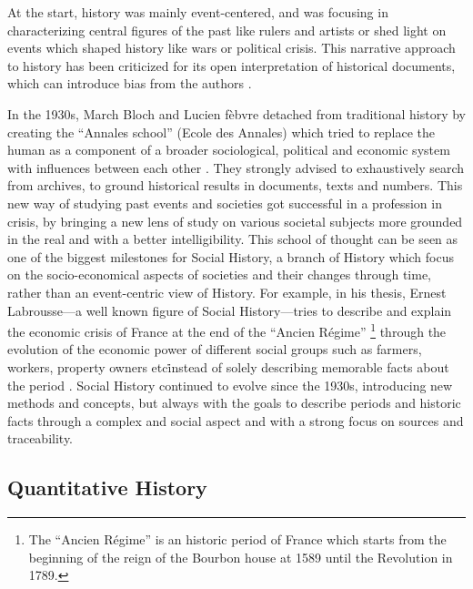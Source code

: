 At the start, history was mainly event-centered, and was focusing in characterizing central figures of the past like rulers and artists or shed light on events which shaped history like wars or political crisis.
This narrative approach to history has been criticized for its open interpretation of historical documents, which can introduce bias from the authors \cite{bourdieuRapportsEntreSociologie1995}.

In the 1930s, March Bloch and Lucien fèbvre detached from traditional history by creating the ``Annales school'' (Ecole des Annales) which tried to replace the human as a component of a broader sociological, political and economic system with influences between each other \cite{burkeHistorySocialTheory2005}.
They strongly advised to exhaustively search from archives, to ground historical results in documents, texts and numbers.
This new way of studying past events and societies got successful in a profession in crisis, by bringing a new lens of study on various societal subjects more grounded in the real and with a better intelligibility.
This school of thought can be seen as one of the biggest milestones for Social History, a branch of History which focus on the socio-economical aspects of societies and their changes through time, rather than an event-centric view of History.
For example, in his thesis, Ernest Labrousse---a well known figure of Social History---tries to describe and explain the economic crisis of France at the end of the ``Ancien Régime'' \footnote{The ``Ancien Régime'' is an historic period of France which starts from the beginning of the reign of the Bourbon house at 1589 until the Revolution in 1789.} through the evolution of the economic power of different social groups such as farmers, workers, property owners etc\. instead of solely describing memorable facts about the period \cite{labrousse1990crise}.
Social History continued to evolve since the 1930s, introducing new methods and concepts, but always with the goals to describe periods and historic facts through a complex and social aspect and with a strong focus on sources and traceability.



\subsection{Quantitative History}\label{subsec:quantitative-history}

